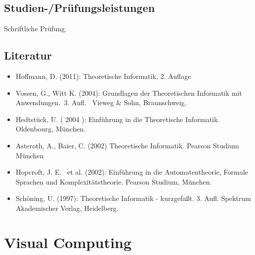 \section*{Studien-/Prüfungsleistungen\label{/mi-2017/modulbeschreibungen-bachelor/BA_TheoretischeInformatik2}}\label{studien-pruxfcfungsleistungenpathlabelmi-2017modulbeschreibungen-bachelorbaux5ftheoretischeinformatik2}

Schriftliche Prüfung.

\section*{Literatur\label{/mi-2017/modulbeschreibungen-bachelor/BA_TheoretischeInformatik2}}\label{literaturpathlabelmi-2017modulbeschreibungen-bachelorbaux5ftheoretischeinformatik2}

\begin{itemize}
\tightlist
\item
  Hoffmann, D. (2011): Theoretische Informatik, 2. Auflage
\item
  Vossen, G., Witt K. (2004): Grundlagen der Theoretischen Informatik
  mit Anwendungen.~3. Aufl.~ Vieweg \& Sohn, Braunschweig.
\item
  Hedtstück, U. ( 2004 ): Einführung in die Theoretische Informatik.
  Oldenbourg, München.
\item
  Asteroth, A., Baier, C. (2002) Theoretische Informatik. Pearson
  Studium München
\item
  Hopcroft, J. E.~ et al. (2002): Einführung in die Automatentheorie,
  Formale Sprachen und Komplexitätstheorie. Pearson Studium, München.
\item
  Schöning, U. (1997): Theoretische Informatik - kurzgefaßt. 3. Aufl.
  Spektrum Akademischer Verlag, Heidelberg.
\end{itemize}

\chapter{Visual
Computing\label{/mi-2017/modulbeschreibungen-bachelor/BA_Vertiefung-Visual-Computing}}\label{visual-computingpathlabelmi-2017modulbeschreibungen-bachelorbaux5fvertiefung-visual-computing}

